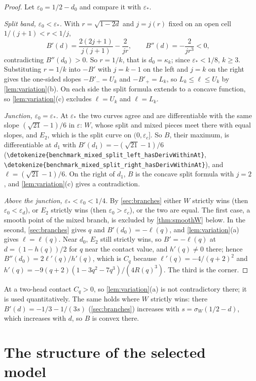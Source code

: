\documentclass[10pt]{article}
\theoremstyle{definition}
\theoremstyle{remark}
\numberwithin{equation}{section}
\newcommand{\eps}{\varepsilon}
\newcommand{\leanid}[1]{\expandafter\nolinkurl\expandafter{\detokenize{#1}}}
\begin{document}
\begin{proof}
Let $\eps_0=1/2-d_0$ and compare it with $\eps_*$.

\emph{Split band, $\eps_0<\eps_*$.} With $r=\sqrt{1-2d}$ and $j=j(r)$ fixed on an open cell $1/(j+1)<r<1/j$,
\[
 B'(d)=\frac{2(2j+1)}{j(j+1)}-\frac2{jr},\qquad B''(d)=-\frac2{jr^3}<0,
\]
contradicting $B''(d_0)>0$. So $r=1/k$, that is $d_0=\kappa_k$; since $\eps_*<1/8$, $k\ge3$. Substituting $r=1/k$ into $-B'$ with $j=k-1$ on the left and $j=k$ on the right gives the one-sided slopes $-B'_-=U_k$ and $-B'_+=L_k$, so $L_k\le\ell\le U_k$ by \cref{lem:variation}(b). On each side the split formula extends to a concave function, so \cref{lem:variation}(c) excludes $\ell=U_k$ and $\ell=L_k$.

\emph{Junction, $\eps_0=\eps_*$.} At $\eps_*$ the two curves agree and are differentiable with the same slope $(\sqrt{21}-1)/6$ in $\eps$: $W$, whose split and mixed pieces meet there with equal slopes, and $E_2$, which is the split curve on $(0,\eps_c]$. So $B$, their maximum, is differentiable at $d_1$ with $B'(d_1)=-(\sqrt{21}-1)/6$ (\leanid{benchmark_mixed_split_left_hasDerivWithinAt}, \leanid{benchmark_mixed_split_right_hasDerivWithinAt}), and $\ell=(\sqrt{21}-1)/6$. On the right of $d_1$, $B$ is the concave split formula with $j=2$, and \cref{lem:variation}(c) gives a contradiction.

\emph{Above the junction, $\eps_*<\eps_0<1/4$.} By \cref{sec:branches} either $W$ strictly wins (then $\eps_0<\eps_d$), or $E_2$ strictly wins (then $\eps_0>\eps_c$), or the two are equal. The first case, a smooth point of the mixed branch, is excluded by \cref{thm:smoothW} below. In the second, \cref{sec:branches} gives $q$ and $B'(d_0)=-\ell(q)$, and \cref{lem:variation}(a) gives $\ell=\ell(q)$. Near $d_0$, $E_2$ still strictly wins, so $B'=-\ell(q)$ at $d=(1-h(q))/2$ for $q$ near the contact value, and $h'(q)\ne0$ there; hence $B''(d_0)=2\ell'(q)/h'(q)$, which is $C_q$ because $\ell'(q)=-4/(q+2)^2$ and $h'(q)=-9(q+2)(1-3q^2-7q^3)/(4R(q)^3)$. The third is the corner.
\end{proof}

At a two-head contact $C_q>0$, so \cref{lem:variation}(a) is not contradictory there; it is used quantitatively. The same holds where $W$ strictly wins: there $B'(d)=-1/3-1/(3s)$ (\cref{sec:branches}) increases with $s=\sigma_W(1/2-d)$, which increases with $d$, so $B$ is convex there.

\section{The structure of the selected model}\label{sec:structure}
\end{document}
